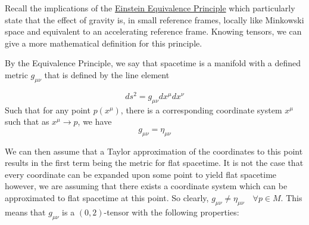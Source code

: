 \documentclass{article}
\begin{document}
 			Recall the implications of the \hyperref[defn:StrongEquivalence]{Einstein Equivalence Principle} which particularly state that the effect of gravity is, in small reference frames, locally like Minkowski space and equivalent to an accelerating reference frame. Knowing tensors, we can give a more mathematical definition for this principle.
 			\begin{thm}
 				By the Equivalence Principle, we say that spacetime is a manifold with a defined metric $g_{\mu\nu}$ that is defined by the line element
 				
 				\begin{equation}
 					\label{eq:MetricInterval}
 					\boxed{ ds^2 = g_{\mu\nu}dx^\mu dx^\nu}
 				\end{equation}
 				Such that for any point $p\left(x^\mu\right)$, there is a corresponding coordinate system $x^\mu$ such that as $x^\mu \to p$, we have
 				$$ g_{\mu\nu} = \eta_{\mu\nu}$$
 			\end{thm} 
 			We can then assume that a Taylor approximation of the coordinates to this point results in the first term being the metric for flat spacetime. It is not the case that every coordinate can be expanded upon some point to yield flat spacetime however, we are assuming that there exists a coordinate system which can be approximated to flat spacetime at this point. So clearly, $g_{\mu\nu} \neq \eta_{\mu\nu} \quad \forall p \in M$. This means that $g_{\mu\nu}$ is a $(0,2)$-tensor with the following properties:
 			
\end{document}
